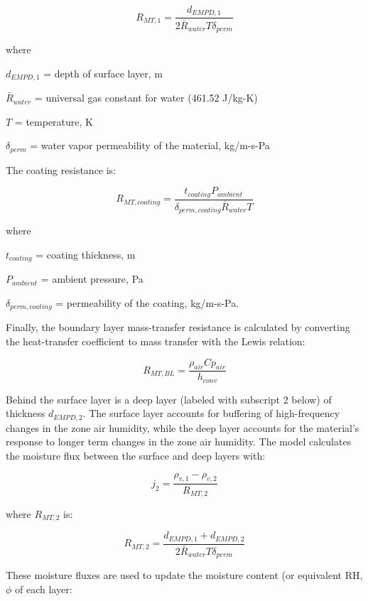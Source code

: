 \begin{equation}
R_{MT,1} = \frac{d_{EMPD,1}} {2 \bar R_{water} T \delta_{perm}}
\end{equation}

where

\(d_{EMPD,1}\) = depth of surface layer, m

\(\bar R_{water}\) = universal gas constant for water (461.52 J/kg-K)

\(T\) = temperature, K

\(\delta_{perm}\) = water vapor permeability of the material, kg/m-s-Pa

The coating resistance is:

\begin{equation}
R_{MT,coating} = \frac {t_{coating} P_{ambient}} {\delta_{perm,coating} \bar R_{water} T}
\end{equation}

where

\(t_{coating}\) = coating thickness, m

\(P_{ambient}\) = ambient pressure, Pa

\(\delta_{perm,coating}\) = permeability of the coating, kg/m-s-Pa.

Finally, the boundary layer mass-transfer resistance is calculated by converting the heat-transfer coefficient to mass transfer with the Lewis relation:

\begin{equation}
R_{MT,BL} = \frac{\rho_{air} Cp_{air}}{h_{conv}}
\end{equation}

Behind the surface layer is a deep layer (labeled with subscript 2 below) of thickness \(d_{EMPD,2}\). The surface layer accounts for buffering of high-frequency changes in the zone air humidity, while the deep layer accounts for the material's response to longer term changes in the zone air humidity. The model calculates the moisture flux between the surface and deep layers with:

\begin{equation}
j_{2} = \frac {\rho_{v,1} - \rho_{v,2}} {R_{MT,2}}
\end{equation}

where \(R_{MT,2}\) is:

\begin{equation}
R_{MT,2} = \frac {d_{EMPD,1} + d_{EMPD,2}} {2 \bar R_{water} T \delta_{perm} }
\end{equation}

These moisture fluxes are used to update the moisture content (or equivalent RH, \(\phi\) of each layer:

